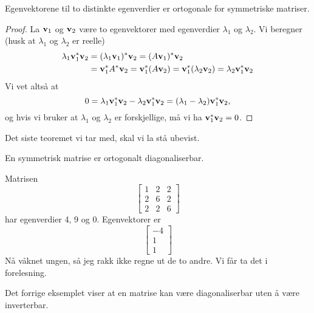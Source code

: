 \begin{thm}
Egenvektorene til to distinkte egenverdier er ortogonale for symmetriske matriser.
\end{thm}

\begin{proof}
La $\mathbf{v}_1$ og $\mathbf{v}_2$ være to egenvektorer med egenverdier $\lambda_1$ og $\lambda_2$. 
Vi beregner (husk at $\lambda_1$ og $\lambda_2$ er reelle)
\begin{align*}
\lambda_1 \mathbf{v}_1^*\mathbf{v}_2&=(\lambda_1 \mathbf{v}_1)^*\mathbf{v}_2=(A \mathbf{v}_1)^*\mathbf{v}_2\\&= \mathbf{v}_1^*A^*\mathbf{v}_2=\mathbf{v}_1^*(A\mathbf{v}_2)=\mathbf{v}_1^*(\lambda_2\mathbf{v}_2)=\lambda_2 \mathbf{v}_1^*\mathbf{v}_2
\end{align*}
Vi vet altså at
\[
0= \lambda_1 \mathbf{v}_1^*\mathbf{v}_2-\lambda_2 \mathbf{v}_1^*\mathbf{v}_2=(\lambda_1-\lambda_2) \mathbf{v}_1^*\mathbf{v}_2,
\]
og hvis vi bruker at $\lambda_1$ og $\lambda_2$ er forskjellige, må vi ha $\mathbf{v}_1^*\mathbf{v}_2=0$.
\end{proof}

\noindent Det siste teoremet vi tar med, skal vi la stå ubevist. 
\begin{thm}
En  symmetrisk matrise er ortogonalt diagonaliserbar.
\end{thm}

\begin{ex}
Matrisen 
\[
\begin{bmatrix}
1 & 2 & 2\\  2 &6 & 2 \\ 2 & 2 & 6
\end{bmatrix}
\]
har egenverdier 4, 9 og 0. Egenvektorer er 
\[
\begin{bmatrix}
-4 \\ 1 \\ 1
\end{bmatrix}
\]
Nå våknet ungen, så jeg rakk ikke regne ut de to andre. Vi får ta det i forelesning.
\end{ex}

\begin{merkx}
Det forrige eksemplet viser at en matrise kan være diagonaliserbar uten å være inverterbar.
\end{merkx}







\kapittelslutt
